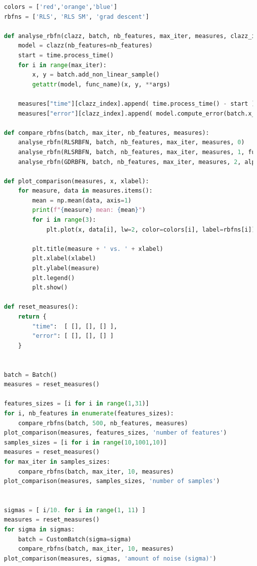 \documentclass[french,12pt]{article}
\begin{document}
\newpage
\begin{lstlisting}[language=Python]
colors = ['red','orange','blue']
rbfns = ['RLS', 'RLS SM', 'grad descent']

def analyse_rbfn(clazz, batch, nb_features, max_iter, measures, clazz_index, func_name="train", **args):
    model = clazz(nb_features=nb_features)
    start = time.process_time()
    for i in range(max_iter):
        x, y = batch.add_non_linear_sample()
        getattr(model, func_name)(x, y, **args)

    measures["time"][clazz_index].append( time.process_time() - start )
    measures["error"][clazz_index].append( model.compute_error(batch.x_data, batch.y_data) )

def compare_rbfns(batch, max_iter, nb_features, measures):
    analyse_rbfn(RLSRBFN, batch, nb_features, max_iter, measures, 0)
    analyse_rbfn(RLSRBFN, batch, nb_features, max_iter, measures, 1, func_name="train_rls_sherman_morrison")
    analyse_rbfn(GDRBFN, batch, nb_features, max_iter, measures, 2, alpha=0.5)

def plot_comparison(measures, x, xlabel):
    for measure, data in measures.items():
        mean = np.mean(data, axis=1)
        print(f"{measure} mean: {mean}")
        for i in range(3):
            plt.plot(x, data[i], lw=2, color=colors[i], label=rbfns[i])

        plt.title(measure + ' vs. ' + xlabel)
        plt.xlabel(xlabel)
        plt.ylabel(measure)
        plt.legend()
        plt.show()

def reset_measures():
    return {
        "time":  [ [], [], [] ],
        "error": [ [], [], [] ]
    }


batch = Batch()
measures = reset_measures()

features_sizes = [i for i in range(1,31)]
for i, nb_features in enumerate(features_sizes):
    compare_rbfns(batch, 500, nb_features, measures)
plot_comparison(measures, features_sizes, 'number of features')
samples_sizes = [i for i in range(10,1001,10)]
measures = reset_measures()
for max_iter in samples_sizes:
    compare_rbfns(batch, max_iter, 10, measures)
plot_comparison(measures, samples_sizes, 'number of samples')


sigmas = [ i/10. for i in range(1, 11) ]
measures = reset_measures()
for sigma in sigmas:
    batch = CustomBatch(sigma=sigma)
    compare_rbfns(batch, max_iter, 10, measures)
plot_comparison(measures, sigmas, 'amount of noise (sigma)')
\end{lstlisting}
\end{document}
